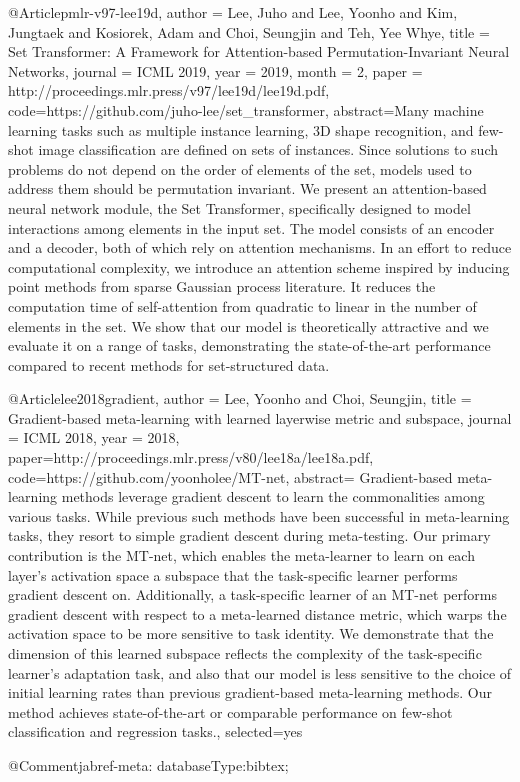 @Article{pmlr-v97-lee19d,
  author    = {Lee, Juho and Lee, Yoonho and Kim, Jungtaek and Kosiorek, Adam and Choi, Seungjin and Teh, Yee Whye},
  title     = {Set Transformer: A Framework for Attention-based Permutation-Invariant Neural Networks},
  journal = {ICML 2019},
  year      = {2019},
  month = {2},
  paper = {http://proceedings.mlr.press/v97/lee19d/lee19d.pdf},
  code={https://github.com/juho-lee/set_transformer},
  abstract={Many machine learning tasks such as multiple instance learning, 3D shape recognition, and few-shot image classification are defined on sets of instances. Since solutions to such problems do not depend on the order of elements of the set, models used to address them should be permutation invariant. We present an attention-based neural network module, the Set Transformer, specifically designed to model interactions among elements in the input set. The model consists of an encoder and a decoder, both of which rely on attention mechanisms. In an effort to reduce computational complexity, we introduce an attention scheme inspired by inducing point methods from sparse Gaussian process literature. It reduces the computation time of self-attention from quadratic to linear in the number of elements in the set. We show that our model is theoretically attractive and we evaluate it on a range of tasks, demonstrating the state-of-the-art performance compared to recent methods for set-structured data.}
}

@Article{lee2018gradient,
  author  = {Lee, Yoonho and Choi, Seungjin},
  title   = {Gradient-based meta-learning with learned layerwise metric and subspace},
  journal = {ICML 2018},
  year    = {2018},
  paper={http://proceedings.mlr.press/v80/lee18a/lee18a.pdf},
  code={https://github.com/yoonholee/MT-net},
  abstract={
    Gradient-based meta-learning methods leverage gradient descent to learn the commonalities among various tasks. 
    While previous such methods have been successful in meta-learning tasks, they resort to simple gradient descent during meta-testing. 
    Our primary contribution is the MT-net, which enables the meta-learner to learn on each layer's activation space a subspace that the task-specific learner performs gradient descent on. 
    Additionally, a task-specific learner of an MT-net performs gradient descent with respect to a meta-learned distance metric, which warps the activation space to be more sensitive to task identity. 
    We demonstrate that the dimension of this learned subspace reflects the complexity of the task-specific learner's adaptation task, and also that our model is less sensitive to the choice of initial learning rates than previous gradient-based meta-learning methods. 
    Our method achieves state-of-the-art or comparable performance on few-shot classification and regression tasks.},
  selected={yes}
}

@Comment{jabref-meta: databaseType:bibtex;}
